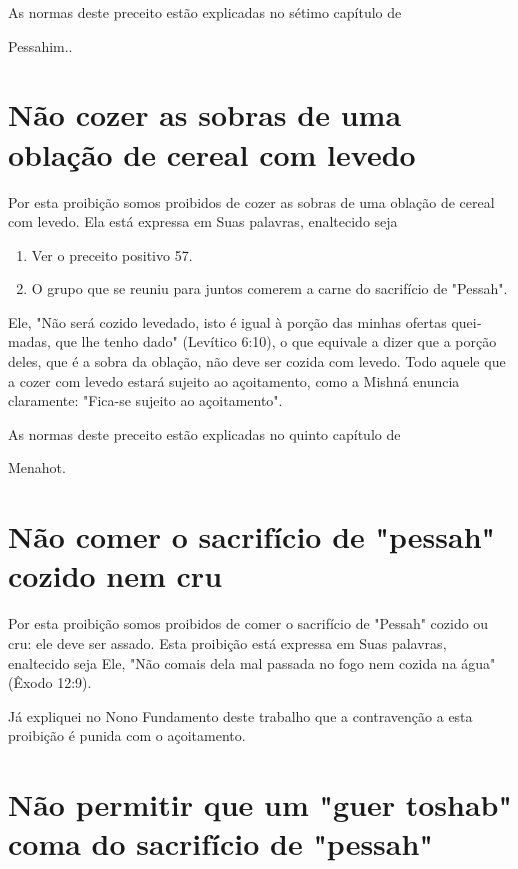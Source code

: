 \begin{itemize}
\begin{enumrate}
\begin{itemize}
\begin{itemize}
\begin{itemize}
As normas deste preceito estão explicadas no sétimo capítulo de


Pessahim..

\section{Não cozer as sobras de uma oblação de cereal com levedo}

Por esta proibição somos proibidos de cozer as sobras de uma obla­ção de
cereal com levedo. Ela está expressa em Suas palavras, enaltecido seja


\begin{enumerate}
\def\labelenumi{\arabic{enumi}.}
\setcounter{enumi}{291}
\item
 
 Ver o preceito positivo 57.
 
\item
 
 O grupo que se reuniu para juntos comerem a carne do sacrifício de
 "Pessah".
 
\end{enumerate}


Ele, "Não será cozido levedado, isto é igual à porção das minhas ofertas
quei­madas, que lhe tenho dado" (Levítico 6:10), o que equivale a dizer
que a por­ção deles, que é a sobra da oblação, não deve ser cozida com
levedo. Todo aquele que a cozer com levedo estará sujeito ao
açoitamento, como a Mishná enuncia claramente: "Fica-se sujeito ao
açoitamento".


As normas deste preceito estão explicadas no quinto capítulo de


Menahot.

\section{Não comer o sacrifício de "pessah" cozido nem cru}

Por esta proibição somos proibidos de comer o sacrifício de "Pes­sah"
cozido ou cru: ele deve ser assado. Esta proibição está expressa em Suas
palavras, enaltecido seja Ele, "Não comais dela mal passada no fogo nem
cozi­da na água" (Êxodo 12:9).

Já expliquei no Nono Fundamento deste trabalho que a contraven­ção a
esta proibição é punida com o açoitamento.

\section{Não permitir que um "guer toshab" coma do sacrifício de "pessah"}


\end{itemize}
\end{itemize}
\end{itemize}
\end{enumrate}
\end{itemize}
